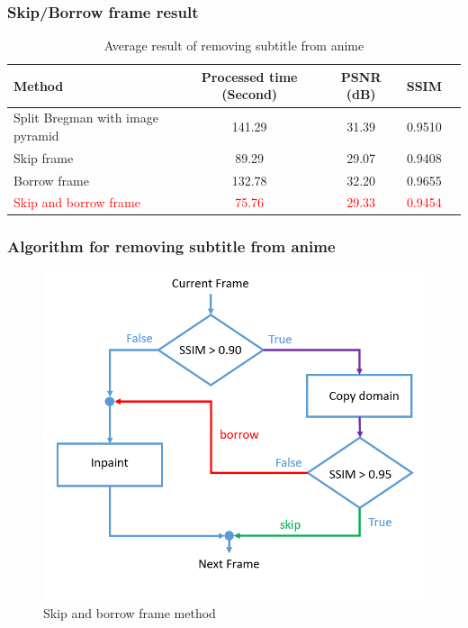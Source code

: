 \documentclass[xcolor=dvipsnames, xetex,serif]{beamer}
\begin{document}
    \begin{frame}
        \frametitle{Skip/Borrow frame result}
        \begin{table}[H]
            \centering
            \begin{tabular}[ht]{|l|c|c|c|c|}
                \hline
                Method  & Processed time  (Second) & PSNR (dB) & SSIM \\
                \hline
                Split Bregman with image pyramid & 141.29 & 31.39  &  0.9510\\
                Skip frame & 89.29 & 29.07 & 0.9408 \\
                Borrow frame & 132.78 & 32.20 & 0.9655\\
                \textcolor{red}{Skip and borrow frame} & \textcolor{red}{75.76} & \textcolor{red}{29.33} & \textcolor{red}{0.9454} \\
                \hline
            \end{tabular}
            \caption{Average result of removing subtitle from anime}
        \end{table}	
    \end{frame}
    \begin{frame}
        \frametitle{Algorithm for removing subtitle from anime}  
        \begin{figure}[H]
            \centering
            \includegraphics[width=0.6\linewidth]{images/skipborrow/flowchart-skipandborrow.png}
            \caption{Skip and borrow frame method}
        \end{figure}        
    \end{frame}
\end{document}
